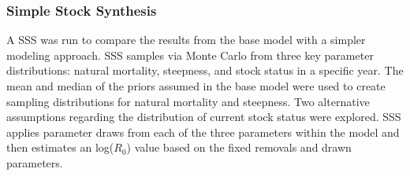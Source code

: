 \documentclass[11pt,
  english,
  a4paper,
]{article}
\begin{document}
\leavevmode\tagmcend\tagstructend\par


\hypertarget{simple-stock-synthesis}{%
\subsubsection{Simple Stock Synthesis}\label{simple-stock-synthesis}}

\leavevmode\tagmcend\tagstructend


A SSS was run to compare the results from the base model with a simpler modeling approach. SSS samples via Monte Carlo from three key parameter distributions: natural mortality, steepness, and stock status in a specific year. The mean and median of the priors assumed in the base model were used to create sampling distributions for natural mortality and steepness. Two alternative assumptions regarding the distribution of current stock status were explored. SSS applies parameter draws from each of the three parameters within the model and then estimates an log({\(R_0\)\leavevmode\tagmcend\tagstructend}) value based on the fixed removals and drawn parameters.

\leavevmode\tagmcend\tagstructend\par
\end{document}
